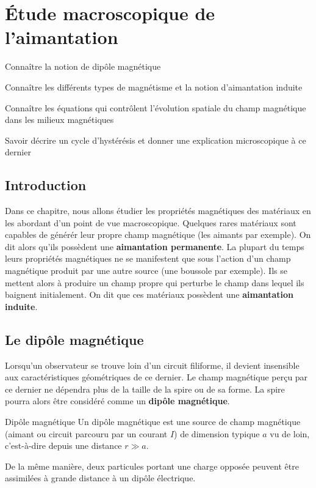 \chapter{Étude macroscopique de l'aimantation}
\begin{objectif}
	\item Connaître la notion de dipôle magnétique
	\item Connaître les différents types de magnétisme et la notion
	  d'aimantation induite
	\item Connaître les équations qui contrôlent l'évolution spatiale
	  du champ magnétique dans les milieux magnétiques
	\item Savoir décrire un cycle d'hystérésis et donner une explication
          microscopique à ce dernier
\end{objectif}
\section*{Introduction}
Dans ce chapitre, nous allons étudier les propriétés magnétiques des matériaux 
en les abordant d'un point de vue macroscopique. Quelques rares matériaux 
sont capables de générér leur propre champ magnétique (les aimants par exemple).
On dit alors qu'ils possèdent une \textbf{aimantation permanente}.
La plupart du temps leurs propriétés magnétiques
ne se manifestent que sous l'action d'un champ magnétique produit par une autre source
(une boussole par exemple). Ils se mettent alors à produire un champ propre qui
perturbe le champ dans lequel ils baignent initialement. 
On dit que ces matériaux possèdent une \textbf{aimantation
induite}.
\section{Le dipôle magnétique}
	Lorsqu'un observateur se trouve loin d'un circuit filiforme, il devient insensible
	aux caractéristiques géométriques de ce dernier. Le champ magnétique perçu par ce 
	dernier ne dépendra plus de la taille de la spire ou de sa forme. La spire 
	pourra alors être considéré comme un \textbf{dipôle magnétique}.

	\begin{defn}{Dipôle magnétique}
		Un dipôle magnétique est une source de champ magnétique (aimant 
		ou circuit parcouru par un courant $I$) de dimension typique $a$
		vu de loin, c'est-à-dire depuis une distance $r \gg a$.
	\end{defn}

	\begin{rema}
		De la même manière, deux particules portant une charge opposée
		peuvent être assimilées à grande distance à un dipôle électrique.
	\end{rema}
	
